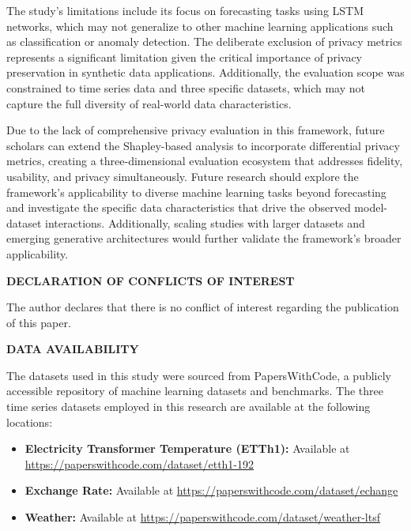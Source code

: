 \documentclass[11pt]{article}
\begin{document}
The study's limitations include its focus on forecasting tasks using LSTM networks, which may not generalize to other machine learning applications such as classification or anomaly detection. The deliberate exclusion of privacy metrics represents a significant limitation given the critical importance of privacy preservation in synthetic data applications. Additionally, the evaluation scope was constrained to time series data and three specific datasets, which may not capture the full diversity of real-world data characteristics.

Due to the lack of comprehensive privacy evaluation in this framework, future scholars can extend the Shapley-based analysis to incorporate differential privacy metrics, creating a three-dimensional evaluation ecosystem that addresses fidelity, usability, and privacy simultaneously. Future research should explore the framework's applicability to diverse machine learning tasks beyond forecasting and investigate the specific data characteristics that drive the observed model-dataset interactions. Additionally, scaling studies with larger datasets and emerging generative architectures would further validate the framework's broader applicability.



\newpage

\begin{center}
\Large\textbf{DECLARATION OF CONFLICTS OF INTEREST}
\end{center}

\vspace{1em}

The author declares that there is no conflict of interest regarding the publication of this paper.

\newpage

\begin{center}
\Large\textbf{DATA AVAILABILITY}
\end{center}

\vspace{1em}

The datasets used in this study were sourced from PapersWithCode, a publicly accessible repository of machine learning datasets and benchmarks. The three time series datasets employed in this research are available at the following locations:

\begin{itemize}
    \item \textbf{Electricity Transformer Temperature (ETTh1):} Available at \url{https://paperswithcode.com/dataset/etth1-192}
    \item \textbf{Exchange Rate:} Available at \url{https://paperswithcode.com/dataset/echange}
    \item \textbf{Weather:} Available at \url{https://paperswithcode.com/dataset/weather-ltsf}
\end{itemize}
\end{document}
